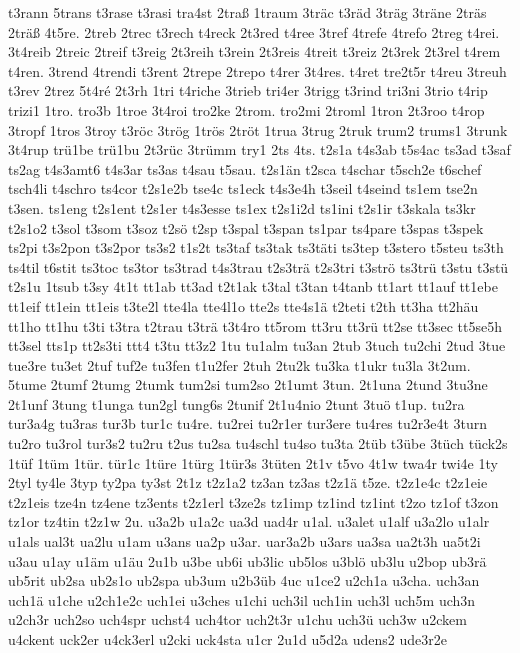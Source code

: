 {t3rann
5trans
t3rase
t3rasi
tra4st
2traß
1traum
3träc
t3räd
3träg
3träne
2träs
2träß
4t5re.
2treb
2trec
t3rech
t4reck
2t3red
t4ree
3tref
4trefe
4trefo
2treg
t4rei.
3t4reib
2treic
2treif
t3reig
2t3reih
t3rein
2t3reis
4treit
t3reiz
2t3rek
2t3rel
t4rem
t4ren.
3trend
4trendi
t3rent
2trepe
2trepo
t4rer
3t4res.
t4ret
tre2t5r
t4reu
3treuh
t3rev
2trez
5t4ré
2t3rh
1tri
t4riche
3trieb
tri4er
3trigg
t3rind
tri3ni
3trio
t4rip
trizi1
1tro.
tro3b
1troe
3t4roi
tro2ke
2trom.
tro2mi
2troml
1tron
2t3roo
t4rop
3tropf
1tros
3troy
t3röc
3trög
1trös
2tröt
1trua
3trug
2truk
trum2
trums1
3trunk
3t4rup
trü1be
trü1bu
2t3rüc
3trümm
try1
2ts
4ts.
t2s1a
t4s3ab
t5s4ac
ts3ad
t3saf
ts2ag
t4s3amt6
t4s3ar
ts3as
t4sau
t5sau.
t2s1än
t2sca
t4schar
t5sch2e
t6schef
tsch4li
t4schro
ts4cor
t2s1e2b
tse4c
ts1eck
t4s3e4h
t3seil
t4seind
ts1em
tse2n
t3sen.
ts1eng
t2s1ent
t2s1er
t4s3esse
ts1ex
t2s1i2d
ts1ini
t2s1ir
t3skala
ts3kr
t2s1o2
t3sol
t3som
t3soz
t2sö
t2sp
t3spal
t3span
ts1par
ts4pare
t3spas
t3spek
ts2pi
t3s2pon
t3s2por
ts3s2
t1s2t
ts3taf
ts3tak
ts3täti
ts3tep
t3stero
t5steu
ts3th
ts4til
t6stit
ts3toc
ts3tor
ts3trad
t4s3trau
t2s3trä
t2s3tri
t3strö
ts3trü
t3stu
t3stü
t2s1u
1tsub
t3sy
4t1t
tt1ab
tt3ad
t2t1ak
t3tal
t3tan
t4tanb
tt1art
tt1auf
tt1ebe
tt1eif
tt1ein
tt1eis
t3te2l
tte4la
tte4l1o
tte2s
tte4s1ä
t2teti
t2th
tt3ha
tt2häu
tt1ho
tt1hu
t3ti
t3tra
t2trau
t3trä
t3t4ro
tt5rom
tt3ru
tt3rü
tt2se
tt3sec
tt5se5h
tt3sel
tts1p
tt2s3ti
ttt4
t3tu
tt3z2
1tu
tu1alm
tu3an
2tub
3tuch
tu2chi
2tud
3tue
tue3re
tu3et
2tuf
tuf2e
tu3fen
t1u2fer
2tuh
2tu2k
tu3ka
t1ukr
tu3la
3t2um.
5tume
2tumf
2tumg
2tumk
tum2si
tum2so
2t1umt
3tun.
2t1una
2tund
3tu3ne
2t1unf
3tung
t1unga
tun2gl
tung6s
2tunif
2t1u4nio
2tunt
3tuö
t1up.
tu2ra
tur3a4g
tu3ras
tur3b
tur1c
tu4re.
tu2rei
tu2r1er
tur3ere
tu4res
tu2r3e4t
3turn
tu2ro
tu3rol
tur3s2
tu2ru
t2us
tu2sa
tu4schl
tu4so
tu3ta
2tüb
t3übe
3tüch
tück2s
1tüf
1tüm
1tür.
tür1c
1türe
1türg
1tür3s
3tüten
2t1v
t5vo
4t1w
twa4r
twi4e
1ty
2tyl
ty4le
3typ
ty2pa
ty3st
2t1z
t2z1a2
tz3an
tz3as
t2z1ä
t5ze.
t2z1e4c
t2z1eie
t2z1eis
tze4n
tz4ene
tz3ents
t2z1erl
t3ze2s
tz1imp
tz1ind
tz1int
t2zo
tz1of
t3zon
tz1or
tz4tin
t2z1w
2u.
u3a2b
u1a2c
ua3d
uad4r
u1al.
u3alet
u1alf
u3a2lo
u1alr
u1als
ual3t
ua2lu
u1am
u3ans
ua2p
u3ar.
uar3a2b
u3ars
ua3sa
ua2t3h
ua5t2i
u3au
u1ay
u1äm
u1äu
2u1b
u3be
ub6i
ub3lic
ub5los
u3blö
ub3lu
u2bop
ub3rä
ub5rit
ub2sa
ub2s1o
ub2spa
ub3um
u2b3üb
4uc
u1ce2
u2ch1a
u3cha.
uch3an
uch1ä
u1che
u2ch1e2c
uch1ei
u3ches
u1chi
uch3il
uch1in
uch3l
uch5m
uch3n
u2ch3r
uch2so
uch4spr
uchst4
uch4tor
uch2t3r
u1chu
uch3ü
uch3w
u2ckem
u4ckent
uck2er
u4ck3erl
u2cki
uck4sta
u1cr
2u1d
u5d2a
udens2
ude3r2e
}
